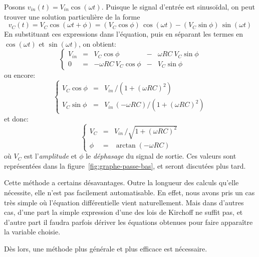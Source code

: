 Posons $v_{in}(t) = V_{in}\cos(\omega t)$.
Puisque le signal d'entrée est sinusoïdal, on peut trouver une solution
particulière de la forme
\[
    v_C(t) = V_C\cos(\omega t + \phi)
    = (V_C\cos\phi)\,\cos(\omega t) - (V_C\sin\phi)\,\sin(\omega t)
\]
En substituant ces expressions dans l'équation,
puis en séparant les termes en $\cos(\omega t)$ et $\sin(\omega t)$,
on obtient:
\[
    \left\{
        \begin{array}{ccrcr}
            V_{in} &=& V_C\cos\phi &-& \omega RC\ V_C\sin\phi \\
            0 &=& -\omega RC\ V_C\cos\phi &-& V_C\sin\phi
        \end{array}
    \right.
\]
ou encore:
\[
    \left\{
        \begin{array}{ccl}
            V_C\cos\phi &=& V_{in}\,/(1+(\omega RC)^2) \\
            V_C\sin\phi &=& V_{in}\,(-\omega RC) / (1+(\omega RC)^2)
        \end{array}
    \right.
\]
et donc:
\begin{equation}
    \left\{
        \begin{array}{ccl}
            V_C &=& V_{in}\,/ \sqrt{1+(\omega RC)^2} \\
            \phi &=& \arctan(-\omega RC)
        \end{array}
    \right.
\end{equation}
où $V_C$ est l'\emph{amplitude} et $\phi$ le \emph{déphasage}
du signal de sortie.
Ces valeurs sont représentées dans la figure~\ref{fig:graphe-passe-bas},
et seront discutées plus tard.

Cette méthode a certains désavantages.
Outre la longueur des calculs qu'elle nécessite,
elle n'est pas facilement automatisable.
En effet, nous avons pris un cas très simple où l'équation différentielle
vient naturellement.
Mais dans d'autres cas,
d'une part la simple expression d'une
des lois de Kirchoff ne suffit pas,
et d'autre part il faudra parfois dériver les équations
obtenues pour faire apparaître la variable choisie.

Dès lors, une méthode plus générale et plus efficace est nécessaire.

